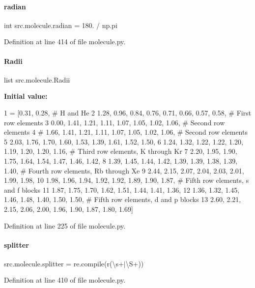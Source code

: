 \paragraph{\texorpdfstring{radian}{radian}}
{\footnotesize\ttfamily int src.\+molecule.\+radian = 180. / np.\+pi}



Definition at line 414 of file molecule.\+py.

\mbox{\label{namespacesrc_1_1molecule_ab6553bc53f79f232d164e967d5162157}} 
\paragraph{\texorpdfstring{Radii}{Radii}}
{\footnotesize\ttfamily list src.\+molecule.\+Radii}

{\bfseries Initial value\+:}
\begin{DoxyCode}
1 =  [0.31, 0.28, \textcolor{comment}{# H and He}
2          1.28, 0.96, 0.84, 0.76, 0.71, 0.66, 0.57, 0.58, \textcolor{comment}{# First row elements}
3          0.00, 1.41, 1.21, 1.11, 1.07, 1.05, 1.02, 1.06, \textcolor{comment}{# Second row elements}
4          \textcolor{comment}{# 1.66, 1.41, 1.21, 1.11, 1.07, 1.05, 1.02, 1.06, # Second row elements}
5          2.03, 1.76, 1.70, 1.60, 1.53, 1.39, 1.61, 1.52, 1.50,
6          1.24, 1.32, 1.22, 1.22, 1.20, 1.19, 1.20, 1.20, 1.16, \textcolor{comment}{# Third row elements, K through Kr}
7          2.20, 1.95, 1.90, 1.75, 1.64, 1.54, 1.47, 1.46, 1.42,
8          1.39, 1.45, 1.44, 1.42, 1.39, 1.39, 1.38, 1.39, 1.40, \textcolor{comment}{# Fourth row elements, Rb through Xe}
9          2.44, 2.15, 2.07, 2.04, 2.03, 2.01, 1.99, 1.98,
10          1.98, 1.96, 1.94, 1.92, 1.92, 1.89, 1.90, 1.87, \textcolor{comment}{# Fifth row elements, s and f blocks}
11          1.87, 1.75, 1.70, 1.62, 1.51, 1.44, 1.41, 1.36,
12          1.36, 1.32, 1.45, 1.46, 1.48, 1.40, 1.50, 1.50, \textcolor{comment}{# Fifth row elements, d and p blocks}
13          2.60, 2.21, 2.15, 2.06, 2.00, 1.96, 1.90, 1.87, 1.80, 1.69]
\end{DoxyCode}


Definition at line 225 of file molecule.\+py.

\mbox{\label{namespacesrc_1_1molecule_a5e161d9ca62759362680a22c03493a92}} 
\paragraph{\texorpdfstring{splitter}{splitter}}
{\footnotesize\ttfamily src.\+molecule.\+splitter = re.\+compile(r\textquotesingle{}(\textbackslash{}s+$\vert$\textbackslash{}S+)\textquotesingle{})}



Definition at line 410 of file molecule.\+py.

